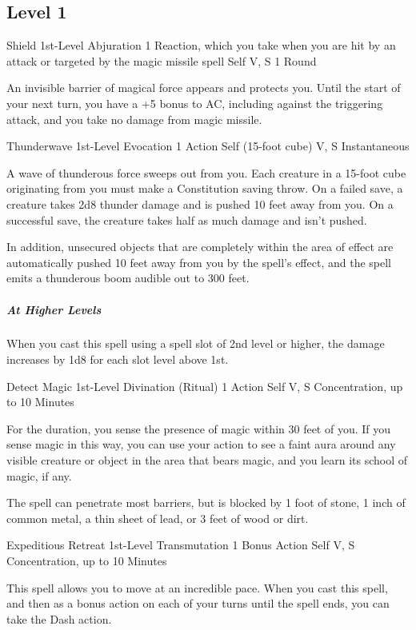 {\subsection*{Level 1}

\DndSpellHeader
  {Shield}
  {1st-Level Abjuration}
  {1 Reaction, which you take when you are hit by an attack or targeted by the magic missile spell}
  {Self}
  {V, S}
  {1 Round}

An invisible barrier of magical force appears and protects you. Until the start of your next turn, you have a +5 bonus to AC, including against the triggering attack, and you take no damage from magic missile.

\DndSpellHeader
  {Thunderwave}
  {1st-Level Evocation}
  {1 Action}
  {Self (15-foot cube)}
  {V, S}
  {Instantaneous}

A wave of thunderous force sweeps out from you. Each creature in a 15-foot cube originating from you must make a Constitution saving throw. On a failed save, a creature takes 2d8 thunder damage and is pushed 10 feet away from you. On a successful save, the creature takes half as much damage and isn’t pushed.

In addition, unsecured objects that are completely within the area of effect are automatically pushed 10 feet away from you by the spell’s effect, and the spell emits a thunderous boom audible out to 300 feet.

\subparagraph*{At Higher Levels} When you cast this spell using a spell slot of 2nd level or higher, the damage increases by 1d8 for each slot level above 1st.

\DndSpellHeader
  {Detect Magic}
  {1st-Level Divination (Ritual)}
  {1 Action}
  {Self}
  {V, S}
  {Concentration, up to 10 Minutes}

For the duration, you sense the presence of magic within 30 feet of you. If you sense magic in this way, you can use your action to see a faint aura around any visible creature or object in the area that bears magic, and you learn its school of magic, if any.

The spell can penetrate most barriers, but is blocked by 1 foot of stone, 1 inch of common metal, a thin sheet of lead, or 3 feet of wood or dirt.

\DndSpellHeader
  {Expeditious Retreat}
  {1st-Level Transmutation}
  {1 Bonus Action}
  {Self}
  {V, S}
  {Concentration, up to 10 Minutes}

This spell allows you to move at an incredible pace. When you cast this spell, and then as a bonus action on each of your turns until the spell ends, you can take the Dash action.

}
